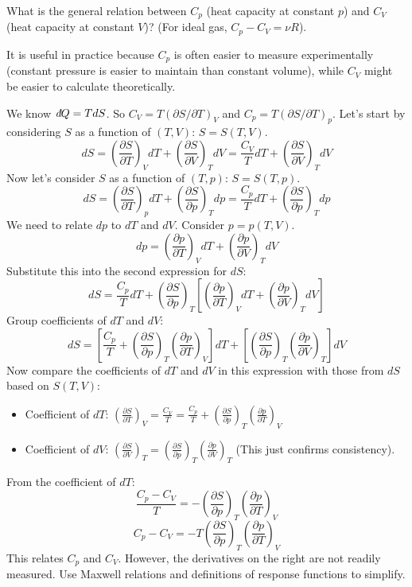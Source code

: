 \documentclass[11pt]{article}
\newcommand{\pderiv}[2]{\frac{\partial #1}{\partial #2}}
\newcommand{\ethbar}{\text{\it{đ}}} %
\begin{document}
What is the general relation between $C_p$ (heat capacity at constant $p$) and $C_V$ (heat capacity at constant $V$)? (For ideal gas, $C_p - C_V = \nu R$).

It is useful in practice because $C_p$ is often easier to measure experimentally (constant pressure is easier to maintain than constant volume), while $C_V$ might be easier to calculate theoretically.

We know $\ethbar Q = T dS$. So $C_V = T(\partial S/\partial T)_V$ and $C_p = T(\partial S/\partial T)_p$.
Let's start by considering $S$ as a function of $(T, V)$: $S=S(T,V)$.
\[ dS = \left(\pderiv{S}{T}\right)_V dT + \left(\pderiv{S}{V}\right)_T dV = \frac{C_V}{T} dT + \left(\pderiv{S}{V}\right)_T dV \]
Now let's consider $S$ as a function of $(T, p)$: $S=S(T,p)$.
\[ dS = \left(\pderiv{S}{T}\right)_p dT + \left(\pderiv{S}{p}\right)_T dp = \frac{C_p}{T} dT + \left(\pderiv{S}{p}\right)_T dp \]
We need to relate $dp$ to $dT$ and $dV$. Consider $p=p(T,V)$.
\[ dp = \left(\pderiv{p}{T}\right)_V dT + \left(\pderiv{p}{V}\right)_T dV \]
Substitute this into the second expression for $dS$:
\[ dS = \frac{C_p}{T} dT + \left(\pderiv{S}{p}\right)_T \left[ \left(\pderiv{p}{T}\right)_V dT + \left(\pderiv{p}{V}\right)_T dV \right] \]
Group coefficients of $dT$ and $dV$:
\[ dS = \left[ \frac{C_p}{T} + \left(\pderiv{S}{p}\right)_T \left(\pderiv{p}{T}\right)_V \right] dT + \left[ \left(\pderiv{S}{p}\right)_T \left(\pderiv{p}{V}\right)_T \right] dV \]
Now compare the coefficients of $dT$ and $dV$ in this expression with those from $dS$ based on $S(T,V)$:
\begin{itemize}
    \item Coefficient of $dT$: $\left(\pderiv{S}{T}\right)_V = \frac{C_V}{T} = \frac{C_p}{T} + \left(\pderiv{S}{p}\right)_T \left(\pderiv{p}{T}\right)_V$
    \item Coefficient of $dV$: $\left(\pderiv{S}{V}\right)_T = \left(\pderiv{S}{p}\right)_T \left(\pderiv{p}{V}\right)_T$ (This just confirms consistency).
\end{itemize}
From the coefficient of $dT$:
\[ \frac{C_p - C_V}{T} = - \left(\pderiv{S}{p}\right)_T \left(\pderiv{p}{T}\right)_V \]
\[ C_p - C_V = -T \left(\pderiv{S}{p}\right)_T \left(\pderiv{p}{T}\right)_V \]
This relates $C_p$ and $C_V$. However, the derivatives on the right are not readily measured. Use Maxwell relations and definitions of response functions to simplify.
\end{document}
